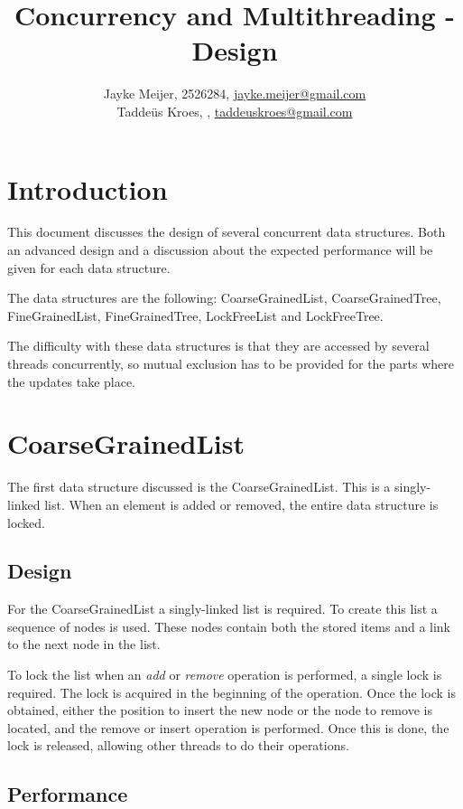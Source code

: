 \documentclass[a4paper]{article}
\title{Concurrency and Multithreading - Design}
\author{Jayke Meijer, 2526284, \url{jayke.meijer@gmail.com} \\
Taddeüs Kroes, , \url{taddeuskroes@gmail.com}}
\begin{document}
\maketitle
\pagebreak

\tableofcontents
\pagebreak

\section{Introduction}

This document discusses the design of several concurrent data
structures. Both an advanced design and a discussion about the
expected performance will be given for each data structure.

The data structures are the following: CoarseGrainedList,
CoarseGrainedTree, FineGrainedList, FineGrainedTree,
LockFreeList and LockFreeTree.

The difficulty with these data structures is that they are
accessed by several threads concurrently, so mutual exclusion has
to be provided for the parts where the updates take place.

\section{CoarseGrainedList}

The first data structure discussed is the CoarseGrainedList.
This is a singly-linked list. When an element is added or removed,
the entire data structure is locked.

\subsection{Design}

For the CoarseGrainedList a singly-linked list is required. To create this
list a sequence of nodes is used. These nodes contain both the stored items
and a link to the next node in the list.

To lock the list when an \emph{add} or \emph{remove} operation is performed,
a single lock is required. The lock is acquired in the beginning of the
operation. Once the lock is obtained, either the position to insert the new
node or the node to remove is located, and the remove or insert operation is
performed. Once this is done, the lock is released, allowing
other threads to do their operations.

\subsection{Performance}
\end{document}
